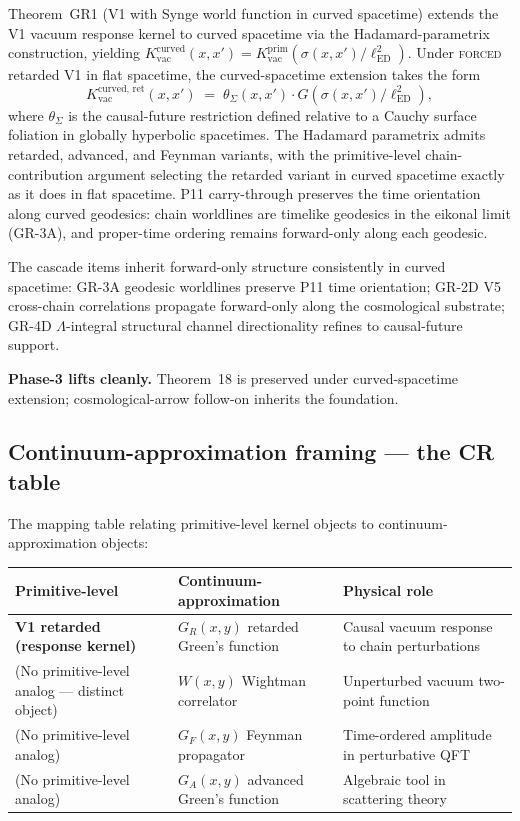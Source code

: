 \documentclass[11pt,a4paper]{article}
\begin{document}
Theorem~GR1 (V1 with Synge world function in curved spacetime) extends the V1 vacuum response kernel to curved spacetime via the Hadamard-parametrix construction, yielding $K_\mathrm{vac}^\mathrm{curved}(x, x') = K_\mathrm{vac}^\mathrm{prim}(\sigma(x, x') / \ell_\mathrm{ED}^2)$. Under \textsc{forced} retarded V1 in flat spacetime, the curved-spacetime extension takes the form
\[
K_\mathrm{vac}^\mathrm{curved,\,ret}(x, x') \;=\; \theta_\Sigma(x, x') \cdot G(\sigma(x, x') / \ell_\mathrm{ED}^2),
\]
where $\theta_\Sigma$ is the causal-future restriction defined relative to a Cauchy surface foliation in globally hyperbolic spacetimes. The Hadamard parametrix admits retarded, advanced, and Feynman variants, with the primitive-level chain-contribution argument selecting the retarded variant in curved spacetime exactly as it does in flat spacetime. P11 carry-through preserves the time orientation along curved geodesics: chain worldlines are timelike geodesics in the eikonal limit (GR-3A), and proper-time ordering remains forward-only along each geodesic.

The cascade items inherit forward-only structure consistently in curved spacetime: GR-3A geodesic worldlines preserve P11 time orientation; GR-2D V5 cross-chain correlations propagate forward-only along the cosmological substrate; GR-4D $\Lambda$-integral structural channel directionality refines to causal-future support.

\textbf{Phase-3 lifts cleanly.} Theorem~18 is preserved under curved-spacetime extension; cosmological-arrow follow-on inherits the foundation.

\subsection{Continuum-approximation framing --- the CR table}

The mapping table relating primitive-level kernel objects to continuum-approximation objects:

\begin{longtable}{p{} p{} p{}}
\toprule
\textbf{Primitive-level} & \textbf{Continuum-approximation} & \textbf{Physical role} \\
\midrule
\endhead
\textbf{V1 retarded (response kernel)} & $G_R(x, y)$ retarded Green's function & Causal vacuum response to chain perturbations \\
(No primitive-level analog --- distinct object) & $W(x, y)$ Wightman correlator & Unperturbed vacuum two-point function \\
(No primitive-level analog) & $G_F(x, y)$ Feynman propagator & Time-ordered amplitude in perturbative QFT \\
(No primitive-level analog) & $G_A(x, y)$ advanced Green's function & Algebraic tool in scattering theory \\
\bottomrule
\end{longtable}
\end{document}

